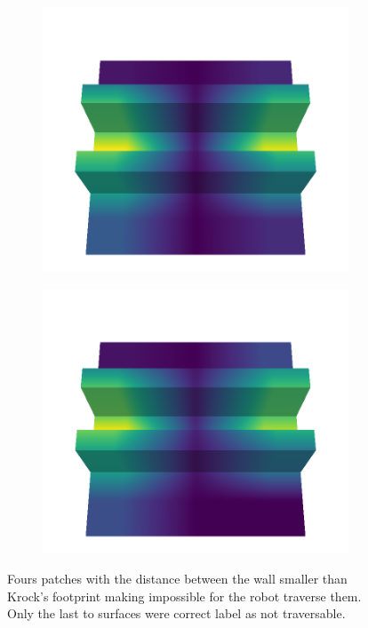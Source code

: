 \documentclass[../document.tex]{subfiles}
\begin{document}
\begin{figure}[htbp]
\begin{subfigure}[b]{0.24\textwidth}
    \end{subfigure}
    \begin{subfigure}[b]{0.24\textwidth}
    \includegraphics[width=\linewidth]{../img/5/custom_patches/tunnel/all/08-3d-grad.png}
    \end{subfigure}
    \begin{subfigure}[b]{0.24\textwidth}
    \includegraphics[width=\linewidth]{../img/5/custom_patches/tunnel/all/09-3d-grad.png}
    \end{subfigure}
    \caption{Fours patches with the distance between the wall smaller than Krock's footprint making impossible for the robot traverse them. Only the last to surfaces were correct label as not traversable.}
    \label{fig : tunnels-grad-cam}
\end{figure}
\end{document}
